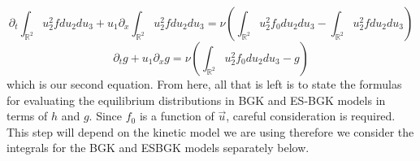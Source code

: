 %
\begin{equation*}
\partial_t \int_{\mathbb{R}^2} u_2^2 f du_2 du_3 + u_1 \partial_x \int_{\mathbb{R}^2} u_2^2 f du_2 du_3 = \nu \left( \int_{\mathbb{R}^2} u_2^2 f_0 du_2 du_3 - \int_{\mathbb{R}^2} u_2^2 f du_2 du_3 \right)
\end{equation*}
%
\begin{equation}
\label{f2Party}
\partial_t g + u_1 \partial_x g = \nu \left( \int_{\mathbb{R}^2} u_2^2 f_0 du_2 du_3 - g \right)
\end{equation}
%
which is our second equation. From here, all that is left is to state the formulas for evaluating the equilibrium distributions in BGK and ES-BGK models in terms of $h$ and $g$. Since $f_0$ is a function of $\vec{u}$, careful consideration is required. This step will depend on the kinetic model we are using therefore we consider the integrals for the BGK and ESBGK models separately below.
